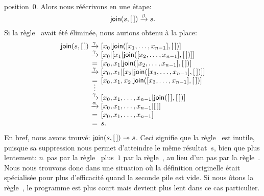 position~\(0\). Alors nous réécrivons en une étape:
\begin{equation*}
\textsf{join}(s,[\,]) \xrightarrow{\smash{\beta}} s.
\end{equation*}
Si la règle~\clause{\beta} avait été éliminée, nous aurions obtenu à
la place:
\begin{equation*}
\begin{array}{r@{\;}c@{\;}l}
\fun{join}(s,\el)
& \smashedrightarrow{\gamma} &
  [x\sb{0}|\fun{join}([x\sb{1},\ldots,x\sb{n-1}],\el)]\\
& \smashedrightarrow{\gamma} &
  [x\sb{0}|[x\sb{1}|\fun{join}([x\sb{2},\ldots,x\sb{n-1}],\el)]]\\
& = & [x\sb{0},x\sb{1}|\fun{join}([x\sb{2},\ldots,x\sb{n-1}],\el)]\\
& \smashedrightarrow{\gamma} &
  [x\sb{0},x\sb{1}|[x\sb{2}|\fun{join}([x\sb{3},\ldots,x\sb{n-1}],\el)]]\\
& = & [x\sb{0},x\sb{1},x\sb{2}|\fun{join}([x\sb{3},\ldots,x\sb{n-1}],\el)]\\
& \smash{\vdots} &\\
& \smashedrightarrow{\gamma} &
  [x\sb{0},x\sb{1},\ldots,x\sb{n-1}|\fun{join}(\el,\el)]\\
& \smashedrightarrow{\alpha} & [x\sb{0},x\sb{1},\ldots,x\sb{n-1}|\el]\\
& = & [x\sb{0},x\sb{1},\ldots,x\sb{n-1}]\\
& = & s.
\end{array}
\end{equation*}
En bref, nous avons trouvé: \(\textsf{join}(s,[\,]) \twoheadrightarrow s\).
Ceci signifie que la règle~\clause{\beta} est inutile, puisque sa
suppression nous permet d'atteindre le même résultat~\(s\), bien que
plus lentement: \(n\)~pas par la règle~\clause{\gamma} plus~\(1\) par
la règle~\clause{\alpha}, au lieu d'un pas par la
règle~\clause{\beta}. Nous nous trouvons donc dans une situation où la
définition originelle était spécialisée pour plus d'efficacité quand
la seconde pile est vide. Si nous ôtons la règle~\clause{\beta}, le
programme est plus court mais devient plus lent dans ce cas
particulier.

